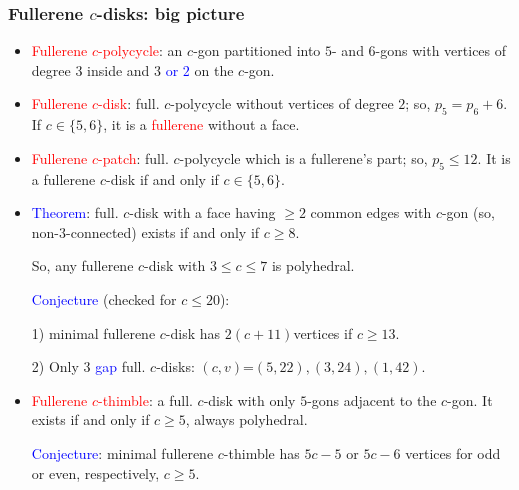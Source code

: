 \documentclass{beamer}
\begin{document}
\begin{frame}\frametitle{Fullerene $c$-disks: big picture}
\vspace{-2mm}
\begin{itemize}
\item \textcolor{red}{Fullerene $c$-polycycle}: an $c$-gon partitioned into $5$- and $6$-gons with
vertices of
degree
$3$ inside
and $3$ \textcolor{blue}{or $2$} on the $c$-gon.
\item \textcolor{red}{Fullerene $c$-disk}: full. $c$-polycycle without vertices of degree $2$; so,
$p_5=p_6+6$. If $c\in\{5,6\}$, it is a \textcolor{red}{fullerene} without a face.
\item \textcolor{red}{Fullerene $c$-patch}: full. $c$-polycycle which is a fullerene's part;
 so, $p_5\le 12$.
It is a fullerene $c$-disk if and only if $c\in\{5,6\}$.
\item \textcolor{blue}{Theorem}: full. $c$-disk with a face
having $\ge $$2$ common edges with 
$c$-gon (so, non-$3$-connected)
exists if and only if $c\ge 8$. 

So, any fullerene $c$-disk with $3\le c\le 7$ 
is polyhedral.

\textcolor{blue}{Conjecture} (checked for $c\le 20$):

1) minimal fullerene $c$-disk  has $2(c+11)$vertices if $c\ge 13$.

2) Only $3$ \textcolor{blue}{gap} 
 full. $c$-disks: $(c,v)$=$(5,22),(3,24),(1,42)$.


\item \textcolor{red}{Fullerene $c$-thimble}: a full. $c$-disk 
with only $5$-gons adjacent to the $c$-gon.
It exists if and only if  $c\ge 5$, always polyhedral.
 
\textcolor{blue}{Conjecture}: 
minimal fullerene $c$-thimble
has $5c-5$ or $5c-6$ vertices for odd or even, respectively, $c\ge 5$.

\end{itemize}
\end{frame}
\end{document}
